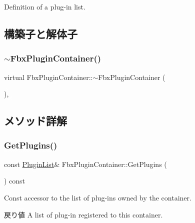 Definition of a plug-\/in list. 



\subsection{構築子と解体子}
\mbox{\label{class_fbx_plugin_container_a8c4030ad7c08c7fdab1b34b7d37ed88e}} 
\subsubsection{\texorpdfstring{$\sim$\+Fbx\+Plugin\+Container()}{~FbxPluginContainer()}}
{\footnotesize\ttfamily virtual Fbx\+Plugin\+Container\+::$\sim$\+Fbx\+Plugin\+Container (\begin{DoxyParamCaption}{ }\end{DoxyParamCaption})\hspace{0.3cm}{\ttfamily [protected]}, {\ttfamily [virtual]}}



\subsection{メソッド詳解}
\mbox{\label{class_fbx_plugin_container_a5fb043debeddd64f7e0f6c34b882b3a9}} 
\subsubsection{\texorpdfstring{Get\+Plugins()}{GetPlugins()}\hspace{0.1cm}{\footnotesize\ttfamily [1/2]}}
{\footnotesize\ttfamily const \hyperlink{class_fbx_plugin_container_a42abd8471efa91f56de2c4c64c220972}{Plugin\+List}\& Fbx\+Plugin\+Container\+::\+Get\+Plugins (\begin{DoxyParamCaption}{ }\end{DoxyParamCaption}) const}

Const accessor to the list of plug-\/ins owned by the container. \begin{DoxyReturn}{戻り値}
A list of plug-\/in registered to this container. 
\end{DoxyReturn}
\mbox{\label{class_fbx_plugin_container_a7afab0ebbb775ef23ea541bec3adc301}} 
